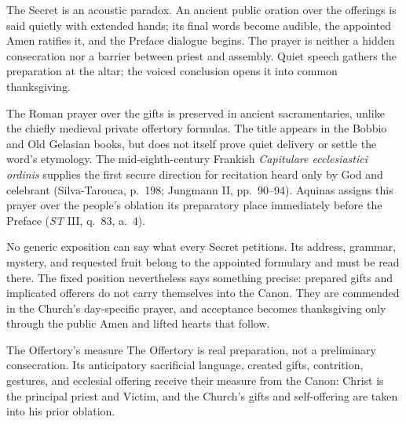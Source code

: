 
The Secret is an acoustic paradox. An ancient public oration over the offerings is said quietly with extended hands; its final words become audible, the appointed Amen ratifies it, and the Preface dialogue begins. The prayer is neither a hidden consecration nor a barrier between priest and assembly. Quiet speech gathers the preparation at the altar; the voiced conclusion opens it into common thanksgiving.

The Roman prayer over the gifts is preserved in ancient sacramentaries, unlike the chiefly medieval private offertory formulas. The title  appears in the Bobbio and Old Gelasian books, but does not itself prove quiet delivery or settle the word's etymology. The mid-eighth-century Frankish \emph{Capitulare ecclesiastici ordinis} supplies the first secure direction for recitation heard only by God and celebrant (Silva-Tarouca, p.~198; Jungmann II, pp.~90--94). Aquinas assigns this prayer over the people's oblation its preparatory place immediately before the Preface (\emph{ST} III, q.~83, a.~4).

No generic exposition can say what every Secret petitions. Its address, grammar, mystery, and requested fruit belong to the appointed formulary and must be read there. The fixed position nevertheless says something precise: prepared gifts and implicated offerers do not carry themselves into the Canon. They are commended in the Church's day-specific prayer, and acceptance becomes thanksgiving only through the public Amen and lifted hearts that follow.

\begin{massbox}{The Offertory's measure}
The Offertory is real preparation, not a preliminary consecration. Its anticipatory sacrificial language, created gifts, contrition, gestures, and ecclesial offering receive their measure from the Canon: Christ is the principal priest and Victim, and the Church's gifts and self-offering are taken into his prior oblation.
\end{massbox}
